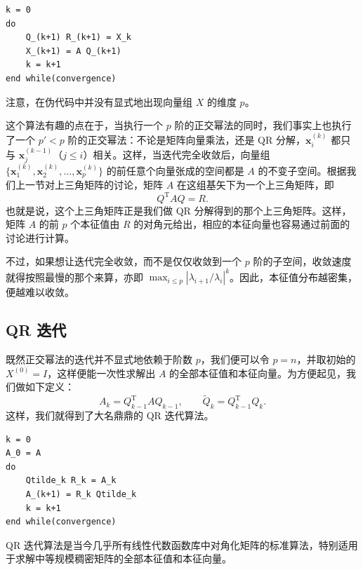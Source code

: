 \begin{algorithmBox}
\begin{lstlisting}[style=bellacode]
k = 0
do
    Q_(k+1) R_(k+1) = X_k
    X_(k+1) = A Q_(k+1)
    k = k+1
end while(convergence)
\end{lstlisting}
\end{algorithmBox}

注意，在伪代码中并没有显式地出现向量组 $X$ 的维度 $p$。

这个算法有趣的点在于，当执行一个 $p$ 阶的正交幂法的同时，我们事实上也执行了一个 $p'<p$ 阶的正交幂法：不论是矩阵向量乘法，还是 QR 分解，$\bm x_i^{(k)}$ 都只与 $\bm x_j^{(k-1)}$（$j\le i$）相关。这样，当迭代完全收敛后，向量组 $\{\bm x_1^{(k)},\bm x_2^{(k)},\ldots,\bm x_p^{(k)}\}$ 的前任意个向量张成的空间都是 $A$ 的不变子空间。根据我们上一节对上三角矩阵的讨论，矩阵 $A$ 在这组基矢下为一个上三角矩阵，即
\begin{equation}
Q^{\mathrm T}AQ=R.
\tag{3.4.24}
\end{equation}
也就是说，这个上三角矩阵正是我们做 QR 分解得到的那个上三角矩阵。这样，矩阵 $A$ 的前 $p$ 个本征值由 $R$ 的对角元给出，相应的本征向量也容易通过前面的讨论进行计算。

不过，如果想让迭代完全收敛，而不是仅仅收敛到一个 $p$ 阶的子空间，收敛速度就得按照最慢的那个来算，亦即 $\max_{i\le p}|\lambda_{i+1}/\lambda_i|^k$。因此，本征值分布越密集，便越难以收敛。

\subsection{QR 迭代}

既然正交幂法的迭代并不显式地依赖于阶数 $p$，我们便可以令 $p=n$，并取初始的 $X^{(0)}=I$，这样便能一次性求解出 $A$ 的全部本征值和本征向量。为方便起见，我们做如下定义：
\begin{equation}
A_k=Q_{k-1}^{\mathrm T}AQ_{k-1},
\qquad
\widetilde Q_k=Q_{k-1}^{\mathrm T}Q_k.
\tag{3.4.25}
\end{equation}
这样，我们就得到了大名鼎鼎的 QR 迭代算法。

\begin{algorithmBox}
\begin{lstlisting}[style=bellacode]
k = 0
A_0 = A
do
    Qtilde_k R_k = A_k
    A_(k+1) = R_k Qtilde_k
    k = k+1
end while(convergence)
\end{lstlisting}
\end{algorithmBox}

QR 迭代算法是当今几乎所有线性代数函数库中对角化矩阵的标准算法，特别适用于求解中等规模稠密矩阵的全部本征值和本征向量。

